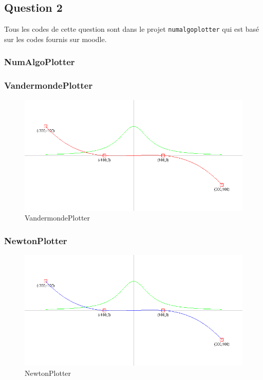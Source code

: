 \subsection{Question 2}

Tous les codes de cette question sont dans le projet \texttt{numalgoplotter} qui est basé sur les codes fournis sur moodle. 

\subsubsection{NumAlgoPlotter}

\subsubsection{VandermondePlotter}

\begin{figure}[H]
	\centering
	\caption{\label{vandermonde} VandermondePlotter}
	\includegraphics[scale = 0.4]{6_VandermondePlotter.png}
\end{figure}

\subsubsection{NewtonPlotter}

\begin{figure}[H]
	\centering
	\caption{\label{newton} NewtonPlotter}
	\includegraphics[scale = 0.4]{6_NewtonPlotter.png}
\end{figure}